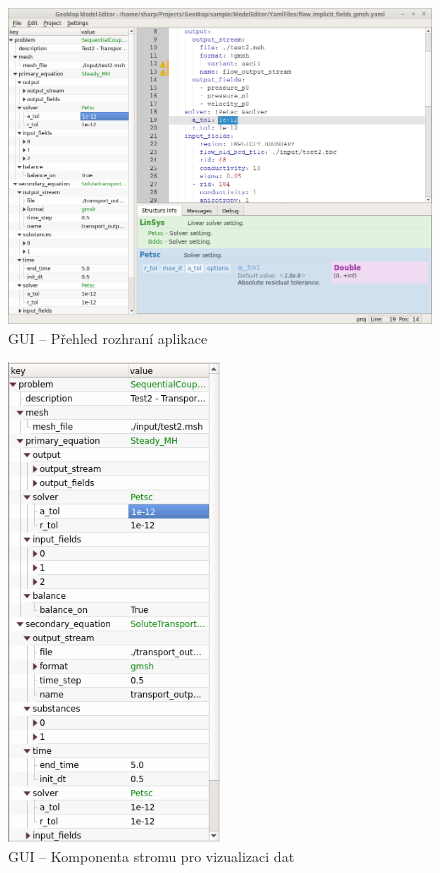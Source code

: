 \documentclass[FM,bw,DP]{tulthesis}
\begin{document}
\begin{figure}[h]
	\centering
    \includegraphics[width=\textwidth]{../img/screenshots/gui_overview.png}
    \caption{GUI -- Přehled rozhraní aplikace}
	\label{img:gui_overview}
\end{figure}

\begin{figure}[h]
	\centering
    \includegraphics[width=0.5\textwidth]{../img/screenshots/gui_tree.png}
    \caption{GUI -- Komponenta stromu pro vizualizaci dat}
	\label{img:gui_tree}
\end{figure}
\end{document}
